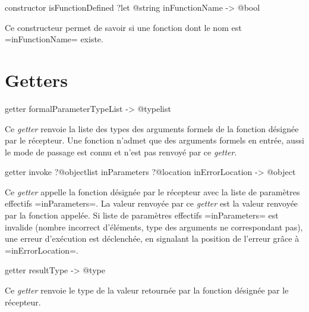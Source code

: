 
\begin{galgas4}
constructor isFunctionDefined ?let @string inFunctionName -> @bool
\end{galgas4}

Ce constructeur permet de savoir si une fonction dont le nom est \ggsq=inFunctionName= existe.






\section{Getters}



\begin{galgas4}
getter formalParameterTypeList -> @typelist
\end{galgas4}

Ce \emph{getter} renvoie la liste des types des arguments formels de la fonction désignée par le récepteur. Une fonction n'admet que des arguments formels en entrée, aussi le mode de passage est connu et n'est pas renvoyé par ce \emph{getter}.





\begin{galgas4}
getter invoke ?@objectlist inParameters
              ?@location inErrorLocation -> @object
\end{galgas4}

Ce \emph{getter} appelle la fonction désignée par le récepteur avec la liste de paramètres effectifs \ggsq=inParameters=. La valeur renvoyée par ce \emph{getter} est la valeur renvoyée par la fonction appelée. Si liste de paramètres effectifs \ggsq=inParameters= est invalide (nombre incorrect d'éléments, type des arguments ne correspondant pas), une erreur d'exécution est déclenchée, en signalant la position de l'erreur grâce à \ggsq=inErrorLocation=.






\begin{galgas4}
getter resultType -> @type
\end{galgas4}

Ce \emph{getter} renvoie le type de la valeur retournée par la fonction désignée par le récepteur.





